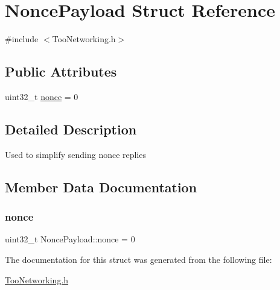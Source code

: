 \hypertarget{structNoncePayload}{}\section{Nonce\+Payload Struct Reference}
\label{structNoncePayload}


{\ttfamily \#include $<$Too\+Networking.\+h$>$}

\subsection*{Public Attributes}
\begin{DoxyCompactItemize}
\item 
uint32\+\_\+t \hyperlink{structNoncePayload_ac738ccf9734f52407eef0b48bdf6cb01}{nonce} = 0
\end{DoxyCompactItemize}


\subsection{Detailed Description}
Used to simplify sending nonce replies 

\subsection{Member Data Documentation}
\mbox{\label{structNoncePayload_ac738ccf9734f52407eef0b48bdf6cb01}} 
\subsubsection{\texorpdfstring{nonce}{nonce}}
{\footnotesize\ttfamily uint32\+\_\+t Nonce\+Payload\+::nonce = 0}



The documentation for this struct was generated from the following file\+:\begin{DoxyCompactItemize}
\item 
\hyperlink{TooNetworking_8h}{Too\+Networking.\+h}\end{DoxyCompactItemize}
